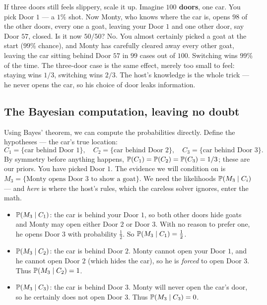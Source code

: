 \begin{intuitionbox}
If three doors still feels slippery, scale it up. Imagine \textbf{$100$ doors}, one car.
You pick Door $1$ --- a $1\%$ shot. Now Monty, who knows where the car is, opens
$98$ of the other doors, every one a goat, leaving your Door $1$ and one other door,
say Door $57$, closed. Is it now $50/50$? No. You almost
certainly picked a goat at the start ($99\%$ chance), and Monty has carefully cleared away
every other goat, leaving the car sitting behind Door $57$ in $99$ cases out of $100$.
Switching wins $99\%$ of the time. The three-door case is the same effect, merely too
small to feel: staying wins $1/3$, switching wins $2/3$. The host's knowledge is the
whole trick --- he never opens the car, so his choice of door leaks information.
\end{intuitionbox}

\subsection{The Bayesian computation, leaving no doubt}

Using Bayes' theorem, we can compute the probabilities directly. Define the hypotheses --- the car's true location:
\[
  C_1 = \{\text{car behind Door 1}\},\quad
  C_2 = \{\text{car behind Door 2}\},\quad
  C_3 = \{\text{car behind Door 3}\}.
\]
By symmetry before anything happens, $\P(C_1)=\P(C_2)=\P(C_3)=1/3$; these are our priors.
You have picked Door $1$. The evidence we will condition on is $M_3 = \{\text{Monty opens
Door 3 to show a goat}\}$. We need the likelihoods $\P(M_3 \given C_i)$ --- and \emph{here}
is where the host's rules, which the careless solver ignores, enter the math.

\begin{itemize}
\item $\P(M_3 \given C_1)$: the car is behind your Door $1$, so both other doors hide
goats and Monty may open either Door $2$ or Door $3$. With no reason to prefer one, he
opens Door $3$ with probability $\tfrac{1}{2}$. So $\P(M_3\given C_1)=\tfrac12$.
\item $\P(M_3 \given C_2)$: the car is behind Door $2$. Monty cannot open your Door $1$,
and he cannot open Door $2$ (which hides the car), so he is \emph{forced} to open Door $3$. Thus
$\P(M_3\given C_2)=1$.
\item $\P(M_3 \given C_3)$: the car is behind Door $3$. Monty will never open the car's
door, so he certainly does not open Door $3$. Thus $\P(M_3\given C_3)=0$.
\end{itemize}

